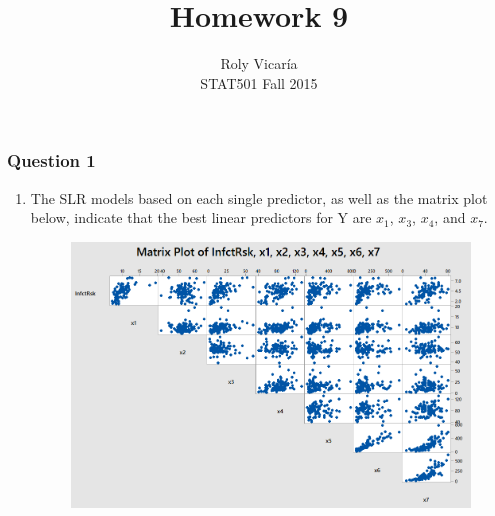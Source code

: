 \documentclass{article}
\title{Homework 9}
\author{Roly Vicar\'ia \\ STAT501 Fall 2015}
\providecommand{\tightlist}{%
      \setlength{\itemsep}{0pt}\setlength{\parskip}{0pt}}
\begin{document}
    
    
    \maketitle
    
    

    
    \subsubsection{Question 1}\label{question-1}

\begin{enumerate}
\def\labelenumi{\alph{enumi})}
\tightlist
\item
  The SLR models based on each single predictor, as well as the matrix
  plot below, indicate that the best linear predictors for Y are
  \(x_1\), \(x_3\), \(x_4\), and \(x_7\).
  
  \begin{figure}[h!]
 \centering
 \includegraphics[scale=.5]{./images/matrix-plot_infectionRisk.png}
\end{figure}
\end{enumerate}
\end{document}
